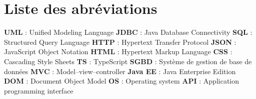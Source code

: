\documentclass[a4paper]{report}
\begin{document}
\chapter*{Liste des abréviations}
\newline
\newline
\newline\newline
\noindent\textbf{UML} : Unified Modeling Language
\newline
\newline
\textbf{JDBC} : Java Database Connectivity
\newline
\newline
\textbf{SQL} : Structured Query Language
\newline
\newline
\textbf{HTTP} : Hypertext Transfer Protocol
\newline
\newline
\textbf{JSON} : JavaScript Object Notation
\newline
\newline
\textbf{HTML} : Hypertext Markup Language
\newline
\newline
\textbf{CSS} : Cascading Style Sheets
\newline
\newline
\textbf{TS} : TypeScript
\newline
\newline
\textbf{SGBD} : Système de gestion de base de données
\newline
\newline
\textbf{MVC} : Model–view–controller
\newline
\newline
\textbf{Java EE} : Java Enterprise Edition
\newline
\newline
\textbf{DOM} : Document Object Model
\newline
\newline
\textbf{OS} : Operating system
\newline
\newline
\textbf{API} : Application programming interface


\tableofcontents

\listoffigures


\thispagestyle{empty}

\renewcommand{\arraystretch}{1.5}
\renewcommand{\theparagraph}{\thesubsubsection.\alph{paragraph}}


~
\thispagestyle{empty}
\setcounter{page}{0}
\newpage



% 
 


\newpage
\end{document}
